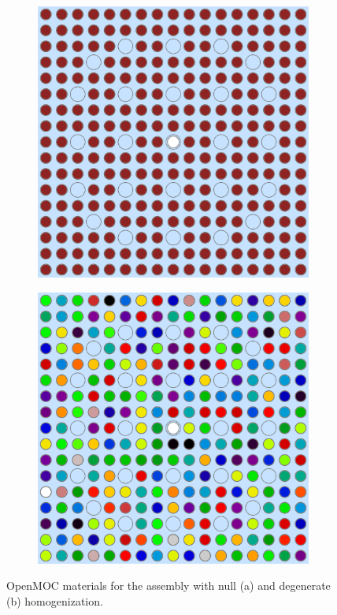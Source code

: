\begin{figure}[h!]
\centering
\begin{subfigure}{0.42\textwidth}
  \centering
  \includegraphics[width=0.8\linewidth]{figures/assembly/geometry}
  \caption{}
  \label{fig:null-assm}
\end{subfigure}
\begin{subfigure}{0.42\textwidth}
  \centering
  \includegraphics[width=0.8\linewidth]{figures/assembly/degenerate-materials}
  \caption{}
  \label{fig:degenerate-assm}
\end{subfigure}
\caption{OpenMOC materials for the assembly with null (a) and degenerate (b) homogenization.}
\label{fig:benchmarks-assm}
\end{figure}

